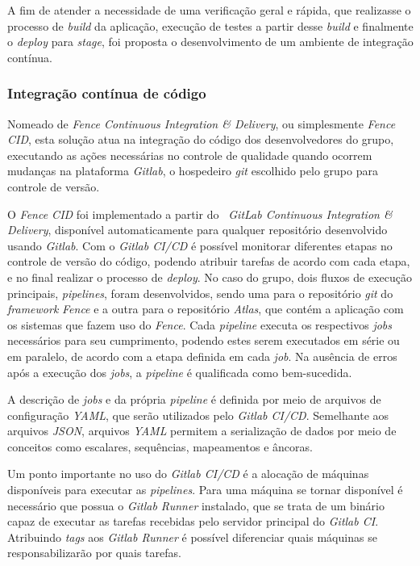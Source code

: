 A fim de atender a necessidade de uma verificação geral e rápida, que realizasse o processo de \emph{build} da aplicação, execução de testes a partir desse \emph{build} e finalmente o \emph{deploy} para \emph{stage}, foi proposta o desenvolvimento de um ambiente de integração contínua.

\hypertarget{integracao-continua-de-código}{%
\subsubsection{Integração contínua de código}\label{integracao-continua-de-código}}

Nomeado de \emph{Fence Continuous Integration \& Delivery}, ou simplesmente \emph{Fence CID}, esta solução atua na integração do código dos desenvolvedores do grupo, executando as ações necessárias no controle de qualidade quando ocorrem mudanças na plataforma \emph{Gitlab}, o hospedeiro \emph{git} escolhido pelo grupo para controle de versão.

O \emph{Fence CID} foi implementado a partir do \emph{~GitLab Continuous Integration \& Delivery}, disponível automaticamente para qualquer repositório desenvolvido usando \emph{Gitlab}. Com o \emph{Gitlab CI/CD} é possível monitorar diferentes etapas no controle de versão do código, podendo atribuir tarefas de acordo com cada etapa, e no final realizar o processo de \emph{deploy}. No caso do grupo, dois fluxos de execução principais, \emph{pipelines}, foram desenvolvidos, sendo uma para o repositório \emph{git} do \emph{framework} \emph{Fence} e a outra para o repositório \emph{Atlas}, que contém a aplicação com os sistemas que fazem uso do \emph{Fence}. Cada \emph{pipeline} executa os respectivos \emph{jobs} necessários para seu cumprimento, podendo estes serem executados em série ou em paralelo, de acordo com a etapa definida em cada \emph{job}. Na ausência de erros após a execução dos \emph{jobs}, a \emph{pipeline} é qualificada como bem-sucedida.

A descrição de \emph{jobs} e da própria \emph{pipeline} é definida por meio de arquivos de configuração \emph{YAML}, que serão utilizados pelo \emph{Gitlab CI/CD}. Semelhante aos arquivos \emph{JSON}, arquivos \emph{YAML} permitem a serialização de dados por meio de conceitos como escalares, sequências, mapeamentos e âncoras.

Um ponto importante no uso do \emph{Gitlab CI/CD} é a alocação de máquinas disponíveis para executar as \emph{pipelines}. Para uma máquina se tornar disponível é necessário que possua o \emph{Gitlab Runner} instalado, que se trata de um binário capaz de executar as tarefas recebidas pelo servidor principal do \emph{Gitlab CI}. Atribuindo \emph{tags} aos \emph{Gitlab Runner} é possível diferenciar quais máquinas se responsabilizarão por quais tarefas.

